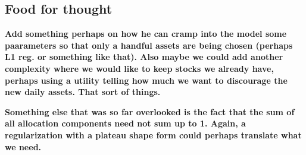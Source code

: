 \subsection*{Food for thought}

\textbf{Add something perhaps on how he can cramp into the model some paarameters so that
  only a handful assets are being chosen (perhaps L1 reg. or something like that).  Also
  maybe we could add another complexity where we would like to keep stocks we already
  have, perhaps using a utility telling how much we want to discourage the new daily
  assets. That sort of things.}

\textbf{Something else that was so far overlooked is the fact that the sum of all
  allocation components need not sum up to 1. Again, a regularization with a plateau shape
  form could perhaps translate what we need.}